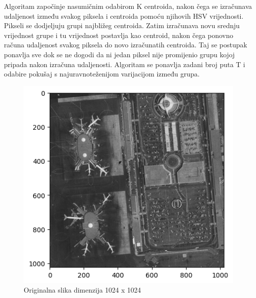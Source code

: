 \documentclass[a4paper,twocolumn]{article}
\begin{document}
        Algoritam započinje nasumičnim odabirom K centroida, nakon čega se izračunava udaljenost između svakog piksela i centroida pomoću njihovih HSV vrijednosti. Pikseli se dodjeljuju grupi najbližeg centroida. Zatim izračunava novu srednju vrijednost grupe i tu vrijednost postavlja kao centroid, nakon čega ponovno računa udaljenost svakog piksela do novo izračunatih centroida. Taj se postupak ponavlja sve dok se ne dogodi da ni jedan piksel nije promijenio grupu kojoj pripada nakon izračuna udaljenosti. 
        Algoritam se ponavlja zadani broj puta T i odabire pokušaj s najuravnoteženijom varijacijom između grupa.
        
        \begin{figure}[H]
        	\centering
        	\includegraphics[width=1\linewidth]{slike/k_means_original.png} 
        	\caption{Originalna slika dimenzija 1024 x 1024}
        	\label{fig:k_means_original}
        \end{figure} 
        
\end{document}
